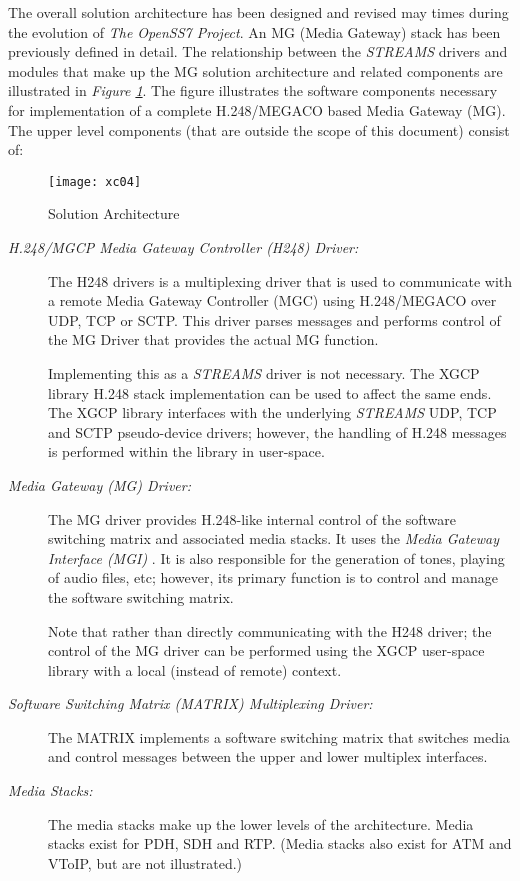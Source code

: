 \documentclass[letterpaper,final,notitlepage,twocolumn,10pt,twoside]{article}
\begin{document}
The overall solution architecture has been designed and revised may times during
the evolution of {\sl The OpenSS7 Project}.  An MG (Media Gateway) stack has
been previously defined in detail.  The relationship between the {\sl STREAMS}
drivers and modules that make up the MG solution architecture and related
components are illustrated in {\sl Figure \ref{figure:xc04}}.  The figure
illustrates the software components necessary for implementation of a complete
H.248/MEGACO based Media Gateway (MG).  The upper level components (that are
outside the scope of this document) consist of:

\begin{figure}[htp]
\center\texttt{[image: xc04]}
\caption{Solution Architecture}
\label{figure:xc04}
\end{figure}

\begin{description}

\item[{\it H.248/MGCP Media Gateway Controller (H248) Driver:}] The H248
drivers is a multiplexing driver that is used to communicate with a remote
Media Gateway Controller (MGC) using H.248/MEGACO over UDP, TCP or SCTP.  This
driver parses messages and performs control of the MG Driver that provides the
actual MG function.

Implementing this as a {\sl STREAMS} driver is not necessary.  The XGCP
library H.248 stack implementation can be used to affect the same ends.  The
XGCP library interfaces with the underlying {\sl STREAMS} UDP, TCP and SCTP
pseudo-device drivers; however, the handling of H.248 messages is performed
within the library in user-space.

\item[{\it Media Gateway (MG) Driver:}]  The MG driver provides H.248-like
internal control of the software switching matrix and associated media stacks.
It uses the {\sl Media Gateway Interface (MGI)} \cite{MGI}.  It is also
responsible for the generation of tones, playing of audio files, etc; however,
its primary function is to control and manage the software switching
matrix.

Note that rather than directly communicating with the H248 driver; the control
of the MG driver can be performed using the XGCP user-space library with a
local (instead of remote) context.

\item[{\it Software Switching Matrix (MATRIX) Multiplexing Driver:}]  The
MATRIX implements a software switching matrix that switches media and control
messages between the upper and lower multiplex interfaces.

\item[{\it Media Stacks:}]  The media stacks make up the lower levels of the
architecture.  Media stacks exist for PDH, SDH and RTP.  (Media stacks also
exist for ATM and VToIP, but are not illustrated.)

\end{description}
\end{document}
